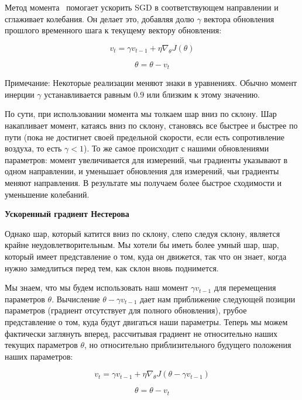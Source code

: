 Метод момента~\cite{QIAN1999145} помогает ускорить
SGD в соответствующем направлении
и сглаживает колебания.
Он делает это, добавляя долю $\gamma$ вектора обновления прошлого
временного шага к текущему вектору обновления:

\begin{equation*}
    v_t = \gamma v_{t-1} + \eta \nabla_{\theta} J(\theta)
\end{equation*}

\begin{equation*}
    \theta = \theta - v_t
\end{equation*}

Примечание: Некоторые реализации меняют знаки в уравнениях.
Обычно момент инерции $\gamma$ устанавливается равным 0.9
или близким к этому значению.

По сути, при использовании момента мы толкаем шар вниз по склону.
Шар накапливает момент, катаясь вниз по склону,
становясь все быстрее и быстрее по пути
(пока не достигнет своей предельной скорости,
если есть сопротивление воздуха, то есть $\gamma < 1$).
То же самое происходит с нашими обновлениями параметров:
момент увеличивается для измерений, чьи градиенты указывают
в одном направлении, и уменьшает обновления для измерений,
чьи градиенты меняют направления.
В результате мы получаем более быстрое
сходимости и уменьшение колебаний.

\textbf{Ускоренный градиент Нестерова}

Однако шар, который катится вниз по склону, слепо следуя склону,
является крайне неудовлетворительным.
Мы хотели бы иметь более умный шар, шар, который имеет
представление о том, куда он движется, так что он знает,
когда нужно замедлиться перед тем, как склон вновь поднимется.

Мы знаем, что мы будем использовать наш момент
$\gamma v_{t-1}$ для перемещения параметров $\theta$.
Вычисление $\theta - \gamma v_{t-1}$ дает нам приближение
следующей позиции параметров
(градиент отсутствует для полного обновления),
грубое представление о том, куда будут двигаться наши параметры.
Теперь мы можем фактически заглянуть вперед,
рассчитывая градиент не относительно наших текущих параметров
$\theta$, но относительно приблизительного
будущего положения наших параметров:

\begin{equation*}
    v_t = \gamma v_{t-1} + \eta \nabla_{\theta} J(\theta - \gamma v_{t-1})
\end{equation*}

\begin{equation*}
    \theta = \theta - v_t
\end{equation*}

